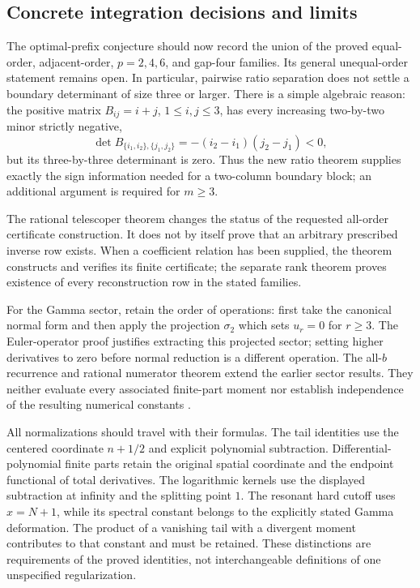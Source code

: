 \subsection{Concrete integration decisions and limits}
\label{audit:decisions}

The optimal-prefix conjecture should now record the union of the
proved equal-order, adjacent-order, $p=2,4,6$, and gap-four families.
Its general unequal-order statement remains open. In particular,
pairwise ratio separation does not settle a boundary determinant of
size three or larger. There is a simple algebraic reason: the positive
matrix $B_{ij}=i+j$, $1\le i,j\le3$, has every increasing
two-by-two minor strictly negative,
\[
 \det B_{\{i_1,i_2\},\{j_1,j_2\}}
       =-(i_2-i_1)(j_2-j_1)<0,
\]
but its three-by-three determinant is zero. Thus the new ratio theorem
supplies exactly the sign information needed for a two-column
boundary block; an additional argument is required for $m\ge3$.

The rational telescoper theorem changes the status of the requested
all-order certificate construction. It does not by itself prove that
an arbitrary prescribed inverse row exists. When a coefficient relation
has been supplied, the theorem constructs and verifies its finite
certificate; the separate rank theorem proves existence of every
reconstruction row in the stated families.

For the Gamma sector, retain the order of operations: first take the
canonical normal form and then apply the projection $\sigma_2$ which
sets $u_r=0$ for $r\ge3$. The Euler-operator proof justifies extracting
this projected sector; setting higher derivatives to zero before
normal reduction is a different operation. The all-$b$ recurrence and
rational numerator theorem extend the earlier sector results. They
neither evaluate every associated finite-part moment nor establish
independence of the resulting numerical constants \cite{DPL,PTI}.

All normalizations should travel with their formulas. The tail
identities use the centered coordinate $n+1/2$ and explicit polynomial
subtraction. Differential-polynomial finite parts retain the original
spatial coordinate and the endpoint functional of total derivatives.
The logarithmic kernels use the displayed subtraction at infinity and
the splitting point $1$. The resonant hard cutoff uses $x=N+1$, while
its spectral constant belongs to the explicitly stated Gamma
deformation. The product of a vanishing tail with a divergent moment
contributes to that constant and must be retained. These distinctions
are requirements of the proved identities, not interchangeable
definitions of one unspecified regularization.

